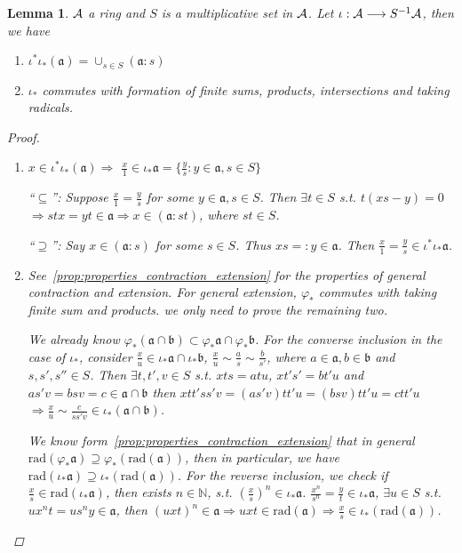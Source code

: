 \documentclass[11pt]{article}
\newtheorem{lemma}[thm]{Lemma}
\newcommand{\sca}{{\mathfrak a}}
\newcommand{\scb}{{\mathfrak b}}
\newcommand{\cala}{{\cal A}}
\newcommand{\Lrta}{\Longrightarrow}
\newcommand{\lrta}{\longrightarrow}
\begin{document}
\begin{lemma}\label{lem:radical_commutates_localization}
$\cala$ a ring and $S$ is a multiplicative set in $\cala$. Let $\iota:\cala\lrta S^{-1}\cala$, then we have
\begin{enumerate}[label=(\alph*)]
\item $\iota^*\iota_*(\sca)=\cup_{s\in S}(\sca:s)$
\item $\iota_*$ commutes with formation of finite sums, products, intersections and taking radicals.
\end{enumerate}
\begin{proof}\ 
\begin{enumerate}[label=(\alph*)]
\item 
$x\in \iota^*\iota_*(\sca)\Lrta $ $\frac{x}{1}\in\iota_*\sca=\{\frac{y}{s}:y\in\sca,s\in S\}$

``$\subseteq$'': Suppose $\frac{x}{1}=\frac{y}{s}$ for some $y\in\sca,s\in S$. Then $\exists t\in S$ s.t. $t(xs-y)=0$ $\Lrta stx=yt \in \sca\Lrta x\in (\sca:st)$, where $st\in S$.

``$\supseteq$'': Say $x\in (\sca:s)$ for some $s\in S$. Thus $xs=:y \in\sca$. Then $\frac{x}{1}=\frac{y}{s}\in \iota^*\iota_*\sca$. 
\item 
See~\ref{prop:properties_contraction_extension} for the properties of general contraction and extension. For general extension, $\varphi_*$ commutes with taking finite sum and products. we only need to prove the remaining two.

We already know $\varphi_*(\sca\cap\scb)\subset\varphi_*\sca\cap\varphi_*\scb$. For the converse inclusion in the case of $\iota_*$, consider $\frac{x}{u}\in \iota_*\sca\cap\iota_*\scb$, $\frac{x}{u}\sim\frac{a}{s}\sim\frac{b}{s'}$, where $a\in \sca, b\in\scb$ and $s,s',s''\in S$.  Then $\exists t, t',v\in S $ s.t. $x t s= a t u$, $x t's'=bt'u$ and $a s' v=b s v=c\in\sca\cap\scb$ then $x t t' ss'v=(a s' v) t t'u=(b sv) t t' u=c tt'u$ $\Lrta \frac{x}{u}\sim\frac{c}{ss'v}\in\iota_*(\sca\cap\scb)$.

We know form~\ref{prop:properties_contraction_extension} that in general $\text{rad}(\varphi_*\sca)\supseteq\varphi_*(\text{rad}(\sca))$, then in particular, we have $\text{rad}(\iota_*\sca)\supseteq\iota_*(\text{rad}(\sca))$. For the reverse inclusion, we check if $\frac{x}{s}\in \text{rad}(\iota_*\sca)$, then exists $n\in\mathbb{N}$, s.t. $\left(\frac{x}{s}\right)^n\in \iota_*\sca$. $\frac{x^n}{s^n}=\frac{y}{t}\in\iota_*\sca$, $\exists u\in S$ s.t. $u x^n t=u s^n y\in\sca$, then $(uxt)^n\in\sca\Lrta uxt\in\text{rad}(\sca)\Lrta \frac{x}{s}\in \iota_*(\text{rad}(\sca))$.
\end{enumerate}
\end{proof}
\end{lemma}
\end{document}
